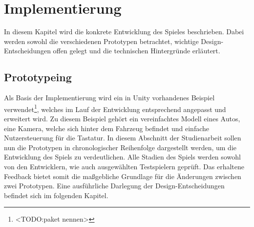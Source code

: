 \section{Implementierung}\label{sec:impl}
In diesem Kapitel wird die konkrete Entwicklung des Spieles beschrieben. Dabei werden sowohl die verschiedenen Prototypen betrachtet, wichtige Design-Entscheidungen offen gelegt und die technischen Hintergründe erläutert.
\subsection{Prototypeing}
	Als Basis der Implementierung wird ein in Unity vorhandenes Beispiel verwendet\footnote{<TODO:paket nennen>}, welches im Lauf der Entwicklung entsprechend angepasst und erweitert wird. Zu diesem Beispiel gehört ein vereinfachtes Modell eines Autos, eine Kamera, welche sich hinter dem Fahrzeug befindet und einfache Nutzersteuerung für die Tastatur.
	In diesem Abschnitt der Studienarbeit sollen nun die Prototypen in chronologischer Reihenfolge dargestellt werden, um die Entwicklung des Spiels zu verdeutlichen. Alle Stadien des Spiels werden sowohl von den Entwicklern, wie auch ausgewählten Testspielern geprüft. Das erhaltene Feedback bietet somit die maßgebliche Grundlage für die Änderungen zwischen zwei Prototypen. Eine ausführliche Darlegung der Design-Entscheidungen befindet sich im folgenden Kapitel.
